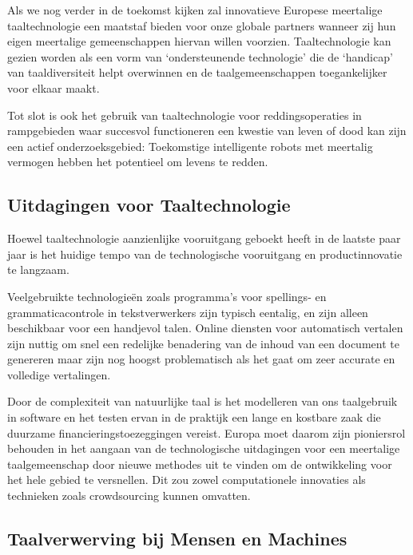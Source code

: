 \begin{multicols}{2}
Als we nog verder in de toekomst kijken zal innovatieve Europese meertalige taaltechnologie een maatstaf bieden voor onze globale partners wanneer zij hun eigen meertalige gemeenschappen hiervan willen voorzien. Taaltechnologie kan gezien worden als een vorm van `ondersteunende technologie' die de `handicap' van taaldiversiteit helpt overwinnen en de taalgemeenschappen toegankelijker voor elkaar maakt.

  Tot slot is ook het gebruik van taaltechnologie voor reddingsoperaties in rampgebieden waar succesvol functioneren een kwestie van leven of dood kan zijn een actief onderzoeksgebied: Toekomstige intelligente robots met meertalig vermogen hebben het potentieel om levens te redden.

\subsection{Uitdagingen voor Taaltechnologie}

Hoewel taaltechnologie aanzienlijke vooruitgang geboekt heeft in de laatste paar jaar is het huidige tempo van de technologische vooruitgang en productinnovatie te langzaam.



Veelgebruikte technologie{\"e}n zoals programma's voor spellings- en grammaticacontrole in tekstverwerkers zijn typisch eentalig, en zijn alleen beschikbaar voor een handjevol talen. Online diensten voor automatisch vertalen zijn nuttig om snel een redelijke benadering van de inhoud van een document te genereren maar zijn nog hoogst problematisch als het gaat om zeer accurate en volledige vertalingen.

Door de complexiteit van natuurlijke taal is het modelleren van ons taalgebruik in software en het testen ervan in de praktijk een lange en kostbare zaak die duurzame financieringstoezeggingen vereist. Europa moet daarom zijn pioniersrol behouden in het aangaan van de technologische uitdagingen voor een meertalige taalgemeenschap door nieuwe methodes uit te vinden om de ontwikkeling voor het hele gebied te versnellen. Dit zou zowel computationele innovaties als technieken zoals crowdsourcing kunnen omvatten.

\subsection{Taalverwerving bij Mensen en Machines}


\end{multicols}

